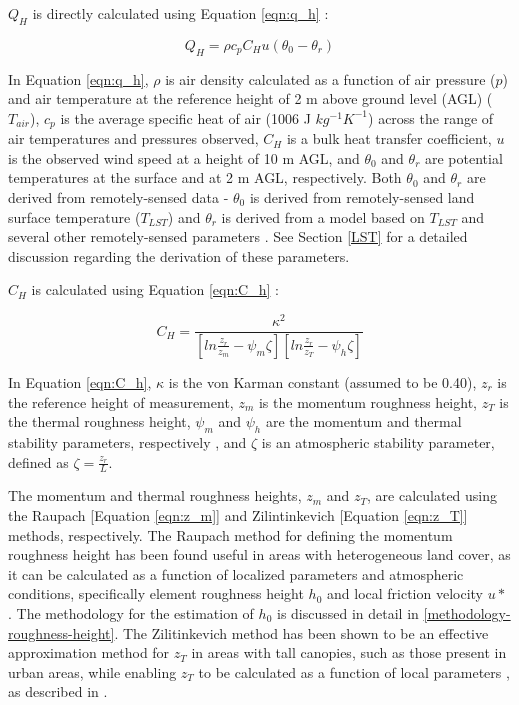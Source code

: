 $Q_H$ is directly calculated using Equation \ref{eqn:q_h} \citep{Pond_1974}:

\begin{equation}
    Q_H = \rho  c_p  C_H  u  (\theta_0 - \theta_r)
    \label{eqn:q_h}
\end{equation}

In Equation \ref{eqn:q_h}, $\rho$ is air density calculated as a function of air pressure ($p$) and air temperature at the reference height of 2 m above ground level (AGL) ($T_{air}$), $c_p$ is the average specific heat of air (1006 J $kg^{-1} K^{-1}$) across the range of air temperatures and pressures observed, $C_H$ is a bulk heat transfer coefficient, $u$ is the observed wind speed at a height of 10 m AGL, and $\theta_0$ and $\theta_r$ are potential temperatures at the surface and at 2 m AGL, respectively.  Both $\theta_0$ and $\theta_r$ are derived from remotely-sensed data - $\theta_0$ is derived from remotely-sensed land surface temperature ($T_{LST}$) and $\theta_r$ is derived from a model based on $T_{LST}$ and several other remotely-sensed parameters \citep{Hrisko_2020}. See Section \ref{LST} for a detailed discussion regarding the derivation of these parameters.

$C_H$ is calculated using Equation \ref{eqn:C_h} \citep{Monin_1954}:

\begin{equation}
    C_H = \frac{\kappa^2}{[ln\frac{z_r}{z_m} - \psi_m \zeta][ln\frac{z_r}{z_T} - \psi_h \zeta]}
    \label{eqn:C_h}
\end{equation}

In Equation \ref{eqn:C_h}, $\kappa$ is the von Karman constant (assumed to be 0.40), $z_r$ is the reference height of measurement, $z_m$ is the momentum roughness height, $z_T$ is the thermal roughness height, $\psi_m$ and $\psi_h$ are the momentum and thermal stability parameters, respectively \citep{Businger_1971} \citep{Dyer_1974}, and $\zeta$ is an atmospheric stability parameter, defined as $\zeta = \frac{z_r}{L}$.

The momentum and thermal roughness heights, $z_m$ and $z_T$, are calculated using the Raupach [Equation \ref{eqn:z_m}] and Zilintinkevich [Equation \ref{eqn:z_T}] methods, respectively. The Raupach method \citep{Raupach_1994} for defining the momentum roughness height has been found useful in areas with heterogeneous land cover, as it can be calculated as a function of localized parameters and atmospheric conditions, specifically element roughness height $h_0$ and local friction velocity $u*$ \citep{Voogt_2000}.  The methodology for the estimation of $h_0$ is discussed in detail in \ref{methodology-roughness-height}. The Zilitinkevich method has been shown to be an effective approximation method for $z_T$ in areas with tall canopies, such as those present in urban areas, while enabling $z_T$ to be calculated as a function of local parameters \citep{Chehn_2009, Zilitinkevich_1995}, as described in \citet{Li_2014}. 

